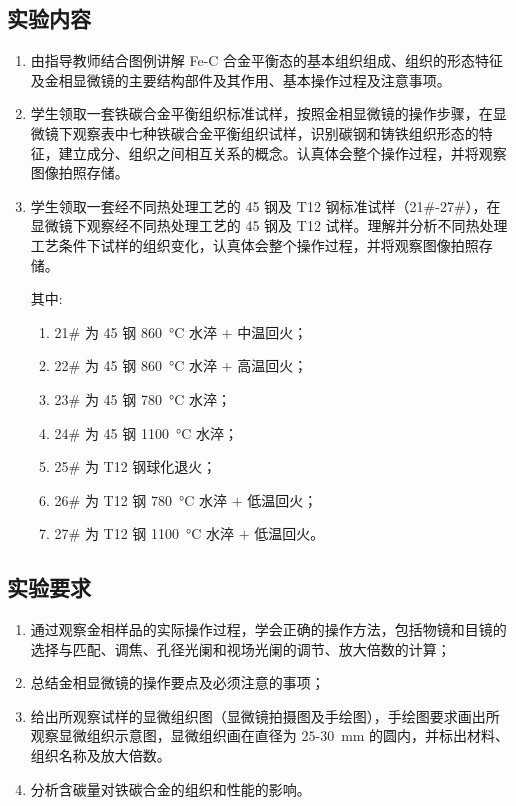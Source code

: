     \subsection{实验内容}
        \begin{enumerate}
            \item 由指导教师结合图例讲解 Fe-C 合金平衡态的基本组织组成、组织的形态特征及金相显微镜的主要结构部件及其作用、基本操作过程及注意事项。
            \item 学生领取一套铁碳合金平衡组织标准试样，按照金相显微镜的操作步骤，在显微镜下观察表中七种铁碳合金平衡组织试样，识别碳钢和铸铁组织形态的特征，建立成分、组织之间相互关系的概念。认真体会整个操作过程，并将观察图像拍照存储。
            \item 学生领取一套经不同热处理工艺的 45 钢及 T12 钢标准试样（21\#-27\#），在显微镜下观察经不同热处理工艺的 45 钢及 T12 试样。理解并分析不同热处理工艺条件下试样的组织变化，认真体会整个操作过程，并将观察图像拍照存储。\par
            其中:\begin{enumerate}
                \item 21\# 为 45 钢 \SI{860}{\degreeCelsius} 水淬 $+$ 中温回火；
                \item 22\# 为 45 钢 \SI{860}{\degreeCelsius} 水淬 $+$ 高温回火；
                \item 23\# 为 45 钢 \SI{780}{\degreeCelsius} 水淬；
                \item 24\# 为 45 钢 \SI{1100}{\degreeCelsius} 水淬；
                \item 25\# 为 T12 钢球化退火；
                \item 26\# 为 T12 钢 \SI{780}{\degreeCelsius} 水淬 $+$ 低温回火；
                \item 27\# 为 T12 钢 \SI{1100}{\degreeCelsius} 水淬 $+$ 低温回火。
            \end{enumerate}
        \end{enumerate}
    \subsection{实验要求}
        \begin{enumerate}
            \item 通过观察金相样品的实际操作过程，学会正确的操作方法，包括物镜和目镜的选择与匹配、调焦、孔径光阑和视场光阑的调节、放大倍数的计算；
            \item 总结金相显微镜的操作要点及必须注意的事项；
            \item 给出所观察试样的显微组织图（显微镜拍摄图及手绘图），手绘图要求画出所观察显微组织示意图，显微组织画在直径为 $25$-\SI{30}{\mm} 的圆内，并标出材料、组织名称及放大倍数。
            \item  分析含碳量对铁碳合金的组织和性能的影响。
        \end{enumerate}
